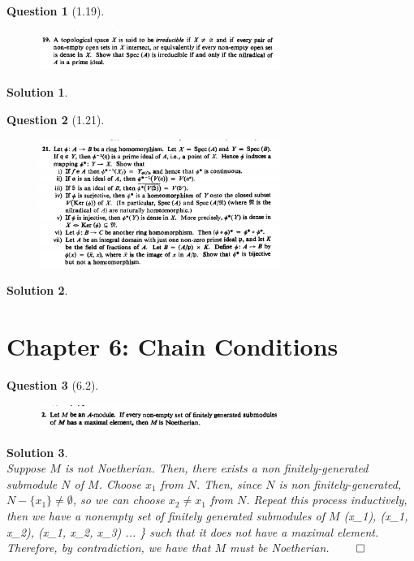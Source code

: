 \documentclass[11pt]{article}
\theoremstyle{plain}
\def\eQb#1\eQe{\begin{eqnarray*}#1\end{eqnarray*}}
\theoremstyle{quest}
\newtheorem*{question}{Question}
\newtheorem*{solution}{Solution}
\begin{document}
\bigskip

\begin{question}[1.19]
\hfill
\begin{figure}[h!]
  \centering
    \includegraphics[width=0.7\textwidth]{d-1-19.png}
\end{figure}
\end{question}
\begin{solution} \hfill \\

\end{solution}

\bigskip

\begin{question}[1.21]
\hfill
\begin{figure}[h!]
  \centering
    \includegraphics[width=0.7\textwidth]{d-1-21.png}
\end{figure}
\end{question}
\begin{solution} \hfill \\

\end{solution}


\section{Chapter 6: Chain Conditions} \label{sec:CC}

\begin{question}[6.2]
\hfill
\begin{figure}[h!]
  \centering
    \includegraphics[width=0.7\textwidth]{d-6-2.png}
\end{figure}
\end{question}
\begin{solution} \hfill \\
Suppose $M$ is not Noetherian. Then, there exists a non finitely-generated submodule
$N$ of $M$. Choose $x_1$ from $N$. Then, since $N$ is non finitely-generated,
$N - \{ x_1 \} \neq \emptyset$, so we can choose $x_2 \neq x_1$ from $N$. Repeat
this process inductively, then we have a nonempty set of finitely generated
submodules of $M$ 
\eQb
\{ (x_1), (x_1, x_2), (x_1, x_2, x_3) ... \}
\eQe
such that it does not have a maximal element. Therefore, by contradiction,
we have that $M$ must be Noetherian. \hfill $\qed$  

\end{solution}
\end{document}
